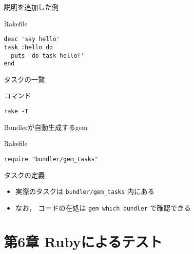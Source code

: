 \documentclass[t, aspectratio=169]{beamer}
\begin{document}
\begin{frame}[fragile,label=sec-5-2-2]{説明を追加した例}
 \begin{block}{Rakefile}
\begin{verbatim}
desc 'say hello'
task :hello do
  puts 'do task hello!'
end
\end{verbatim}
\end{block}
\end{frame}

\begin{frame}[fragile,label=sec-5-2-3]{タスクの一覧}
 \begin{block}{コマンド}
\begin{verbatim}
rake -T
\end{verbatim}
\end{block}
\end{frame}

\begin{frame}[fragile,label=sec-5-2-4]{Bundlerが自動生成するgem}
 \begin{block}{Rakefile}
\begin{verbatim}
require "bundler/gem_tasks"
\end{verbatim}
\end{block}

\begin{block}{タスクの定義}
\begin{itemize}
\item 実際のタスクは \texttt{bundler/gem\_tasks} 内にある
\item なお， コードの在処は \texttt{gem which bundler} で確認できる
\end{itemize}
\end{block}
\end{frame}

\part{第6章 Rubyによるテスト}
\label{sec-6}
\end{document}
